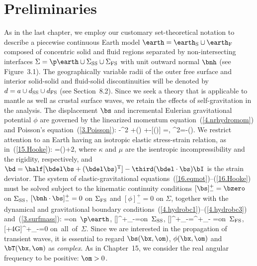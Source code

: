 \section{Preliminaries}

As in the last chapter, we employ our customary set-theoretical
notation to describe a piecewise continuous Earth model
$\earth=\earth_{\rm S}\cup\earth_{\rm F}$ composed of
concentric solid and fluid regions separated by non-intersecting
interfaces $\Sigma=\p\earth\cup\Sigma_{\rm SS}\cup\Sigma_{\rm FS}$
with unit outward normal $\bnh$ (see Figure~3.1).  The geographically
variable radii of the outer free surface and interior solid-solid
and fluid-solid discontinuities will be denoted by
$d=a\cup d_{\rm SS}\cup d_{\rm FS}$ (see Section~8.2).
Since we seek a theory that is applicable to mantle as well as
crustal surface waves, we retain the effects of self-gravitation
in the analysis.  The displacement $\bs$ and incremental
Eulerian gravitational potential $\phi$ are governed by the
linearized momentum equation~(\ref{4.nrhydromom}) and Poisson's
equation~(\ref{3.Poisson}):
%
\eq
\label{16.eqmot}
-\omega^2\rho\hspace{0.3 mm}\bs
+\bdel(\rho\hspace{0.3 mm}\bs\cdot\bdel\phi)
+\rho\bdel\phi-[\bdel\cdot(\rho\hspace{0.3 mm}\bs)]
\bdel\phi=\bdel\cdot\bT,
\en
\eq \label{16.Poisson}
\del^2\phi=-\bdel\cdot(\rho\hspace{0.3 mm}\bs).
\en
We restrict attention to an Earth having an isotropic
elastic stress-strain relation, as in~(\ref{15.Hooke}):
%
\eq \label{16.Hooke}
\bT=\kappa(\bdel\cdot\bs)\bI+2\mu\bd,
\en
where $\kappa$ and $\mu$ are the isentropic incompressibility and
the rigidity, respectively, and $\bd=\half[\bdel\bs+(\bdel\bs)^{\rm T}]
-\third(\bdel\cdot\bs)\bI$ is the strain deviator.
The system of elastic-gravitational
equations~(\ref{16.eqmot})--(\ref{16.Hooke})
must be solved subject to the kinematic continuity conditions
%
%
%
$[\bs]^+_-=\bzero$ on $\Sigma_{\rm SS}$,
$[\bnh\cdot\bs]^+_-=0$ on $\Sigma_{\rm FS}$
and $[\phi]^+_-=0$ on $\Sigma$, together with
the dynamical and gravitational boundary
conditions~(\ref{4.hydrobc1})--(\ref{4.hydrobc3})
and~(\ref{3.surfmass}):
\eq \label{16.bceqn1}
\bnh\cdot\bT=\bzero\quad\mbox{on $\p\earth$},
\en
\eq \label{16.bceqn2}
[\bnh\cdot\bT]^+_-=\bzero\quad\mbox{on $\Sigma_{\rm SS}$},
\en
\eq \label{16.bceqn3}
[\bnh\cdot\bT]^+_-=\bnh[\bnh\cdot\bT\cdot\bnh]^+_-
=\bzero\quad\mbox{on $\Sigma_{\rm FS}$},
\en
\eq \label{16.bceqn4}
[\bnh\cdot\bdel\phi+4\pi G\rho\bnh\cdot\bs]^+_-=0
\quad\mbox{on all of $\Sigma$.}
\en
Since we are interested in the propagation
of transient waves, it is essential to regard
$\bs(\bx,\om)$, $\phi(\bx,\om)$ and $\bT(\bx,\om)$ as
{\em complex\/}.  As in Chapter~15, we consider
the real angular frequency to be positive: $\om>0$.

